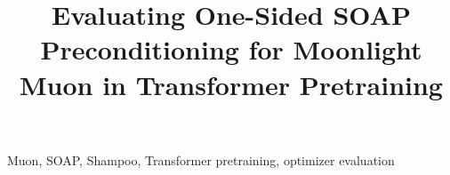\documentclass[conference]{IEEEtran}
\begin{document}
\title{Evaluating One-Sided SOAP Preconditioning for Moonlight Muon in Transformer Pretraining}

\author{
}

\maketitle

\begin{abstract}

\end{abstract}

\begin{IEEEkeywords}
Muon, SOAP, Shampoo, Transformer pretraining, optimizer evaluation
\end{IEEEkeywords}









\appendices




\end{document}
